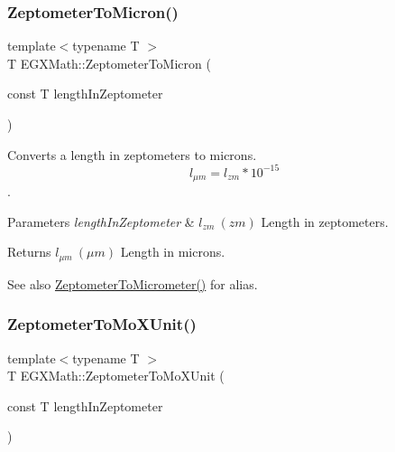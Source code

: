\subsubsection{\texorpdfstring{Zeptometer\+To\+Micron()}{ZeptometerToMicron()}}
{\footnotesize\ttfamily template$<$typename T $>$ \\
T E\+G\+X\+Math\+::\+Zeptometer\+To\+Micron (\begin{DoxyParamCaption}\item[{const T}]{length\+In\+Zeptometer }\end{DoxyParamCaption})}



Converts a length in zeptometers to microns. \[ l_{\mu m}=l_{zm} * 10^{-15} \]. 


\begin{DoxyParams}{Parameters}
{\em length\+In\+Zeptometer} & $ l_{zm}\ (zm)$ Length in zeptometers. \\
\hline
\end{DoxyParams}
\begin{DoxyReturn}{Returns}
$ l_{\mu m}\ (\mu m)$ Length in microns. 
\end{DoxyReturn}
\begin{DoxySeeAlso}{See also}
\mbox{\hyperlink{group___e_g_x_math-_conversions-_length_conversions-_zeptometer-_s_i_ga3ff7c51338abdb80d18becf7245a32fd}{Zeptometer\+To\+Micrometer()}} for alias. 
\end{DoxySeeAlso}
\mbox{\label{group___e_g_x_math-_conversions-_length_conversions-_zeptometer-_non-_s_i_gaa621a874847d7e6aae8d04395c68a313}} 
\subsubsection{\texorpdfstring{Zeptometer\+To\+Mo\+X\+Unit()}{ZeptometerToMoXUnit()}}
{\footnotesize\ttfamily template$<$typename T $>$ \\
T E\+G\+X\+Math\+::\+Zeptometer\+To\+Mo\+X\+Unit (\begin{DoxyParamCaption}\item[{const T}]{length\+In\+Zeptometer }\end{DoxyParamCaption})}



